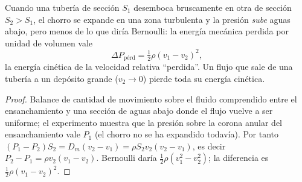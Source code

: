 \begin{proposition}\label{prop:b2:flow-balances:borda}
Cuando una tubería de sección $S_1$ desemboca bruscamente en otra de sección $S_2
> S_1$, el chorro se expande en una zona turbulenta y la presión
\emph{sube} aguas abajo, pero menos de lo que diría Bernoulli: la
energía mecánica perdida por unidad de volumen vale
\[
\Delta P_{\text{pérd}} = \tfrac12\rho(v_1 - v_2)^2 ,
\]
la energía cinética de la velocidad relativa ``perdida''. Un flujo que sale
de una tubería a un depósito grande ($v_2 \to 0$) pierde toda su energía cinética.
\end{proposition}

\begin{proof}
Balance de cantidad de movimiento sobre el fluido comprendido entre el
ensanchamiento y una sección de aguas abajo donde el flujo vuelve a ser
uniforme; el experimento muestra que la presión sobre la corona anular del
ensanchamiento vale $P_1$ (el chorro no se ha expandido todavía). Por tanto $(P_1 - P_2)S_2 = D_m(v_2 - v_1) = \rho S_2v_2(v_2 -
v_1)$, es decir $P_2 - P_1 = \rho v_2(v_1 - v_2)$. Bernoulli daría
$\tfrac12\rho(v_1^2 - v_2^2)$; la diferencia es $\tfrac12\rho(v_1 - v_2)^2$.
\end{proof}

